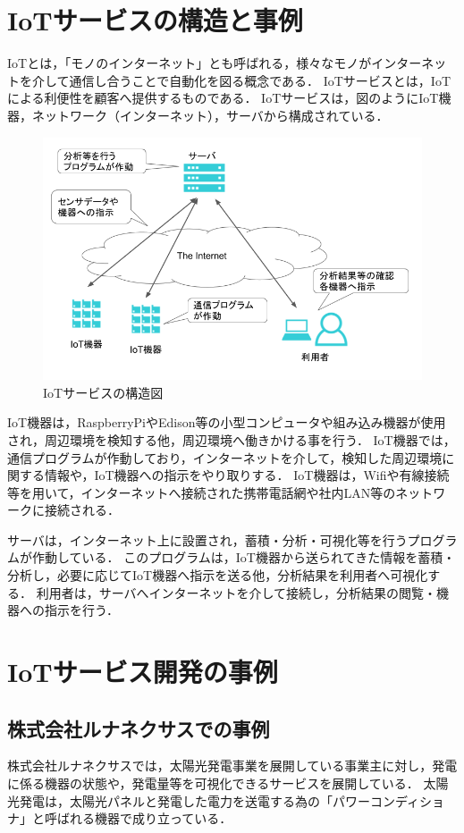 \section{IoTサービスの構造と事例}
IoTとは，「モノのインターネット」とも呼ばれる，様々なモノがインターネットを介して通信し合うことで自動化を図る概念である．
IoTサービスとは，IoTによる利便性を顧客へ提供するものである．
IoTサービスは，図のようにIoT機器，ネットワーク（インターネット），サーバから構成されている．
\begin{figure}[htbp]
\includegraphics[width=16cm]{images/IoTstract.png}
\caption{IoTサービスの構造図}
\label{fig:iotstract}
\end{figure}

IoT機器は，RaspberryPiやEdison等の小型コンピュータや組み込み機器が使用され，周辺環境を検知する他，周辺環境へ働きかける事を行う．
IoT機器では，通信プログラムが作動しており，インターネットを介して，検知した周辺環境に関する情報や，IoT機器への指示をやり取りする．
IoT機器は，Wifiや有線接続等を用いて，インターネットへ接続された携帯電話網や社内LAN等のネットワークに接続される．
\medskip

サーバは，インターネット上に設置され，蓄積・分析・可視化等を行うプログラムが作動している．
このプログラムは，IoT機器から送られてきた情報を蓄積・分析し，必要に応じてIoT機器へ指示を送る他，分析結果を利用者へ可視化する．
利用者は，サーバへインターネットを介して接続し，分析結果の閲覧・機器への指示を行う．

\section{IoTサービス開発の事例}

\subsection{株式会社ルナネクサスでの事例}
株式会社ルナネクサスでは，太陽光発電事業を展開している事業主に対し，発電に係る機器の状態や，発電量等を可視化できるサービスを展開している．
太陽光発電は，太陽光パネルと発電した電力を送電する為の「パワーコンディショナ」と呼ばれる機器で成り立っている．
\medskip

